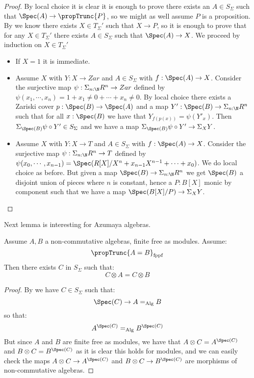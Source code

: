 \begin{proof}
By local choice it is clear it is enough to prove there exists an $A\in S_\Sigma$ such that $\Spec(A)\to \propTrunc{P}$, so we might as well assume $P$ is a proposition. By  we know there exists $X\in T_\Sigma'$ such that $X\to P$, so it is enough to prove that for any $X\in T_\Sigma'$ there exists $A\in S_\Sigma$ such that $\Spec(A)\to X$. We proceed by induction on $X\in T_\Sigma'$
\begin{itemize}
\item If $X=1$ it is immediate. 

\item Assume $X$ with $Y:X\to Zar$ and $A\in S_\Sigma$ with $f:\Spec(A)\to X$. Consider the surjective map $\psi : \Sigma_{n:\N}R^n\to Zar$ defined by $\psi(x_1,\cdots,x_n) = 1 + x_1\not=0 +\cdots + x_n\not=0$. By local choice there exists a Zariski cover $p:\Spec(B)\to \Spec(A)$ and a map $Y':\Spec(B)\to \Sigma_{n:\N}R^n$ such that for all $x:\Spec(B)$ we have that $Y_{f(p(x))} = \psi(Y'_x)$. Then $\Sigma_{\Spec(B)} \psi\circ Y' \in S_\Sigma$ and we have a map $\Sigma_{\Spec(B)} \psi\circ Y'\to \Sigma_XY$.

\item Assume $X$ with $Y:X\to T$ and $A\in S_\Sigma$ with $f:\Spec(A)\to X$. Consider the surjective map $\psi : \Sigma_{n:\N}R^n\to T$ defined by $\psi(x_0,\cdots,x_{n-1}) = \Spec(R[X]/X^n+x_{n-1}X^{n-1}+\cdots+x_0)$. We do local choice as before. But given a map $\Spec(B)\to \Sigma_{n:\N}R^n$ we get $\Spec(B)$ a disjoint union of pieces where $n$ is constant, hence a $P:B[X]$ monic by component such that we have a map $\Spec(B[X]/P) \to \Sigma_XY$.
\end{itemize}
\end{proof}

Next lemma is interesting for Azumaya algebras.

\begin{lemma}
Assume $A,B$ a non-commutative algebras, finite free as modules. Assume:
\[\propTrunc{A=B}_{\mathrm{fppf}}\]
Then there exists $C$ in $S_\Sigma$ such that:
\[C\otimes A = C\otimes B\]
\end{lemma}

\begin{proof}
By  we have $C\in S_\Sigma$ such that:
\[\Spec(C)\to A=_{\mathrm{Alg}}B\]
so that:
\[A^{\Spec(C)} =_{\mathrm{Alg}} B^{\Spec(C)}\]
But since $A$ and $B$ are finite free as modules, we have that $A\otimes C = A^{\Spec(C)}$ and $B\otimes C = B^{\Spec(C)}$ as it is clear this holds for modules, and we can easily check the maps $A\otimes C\to A^{\Spec(C)}$ and $B\otimes C\to B^{\Spec(C)}$ are morphisms of non-commutative algebras.
\end{proof}

